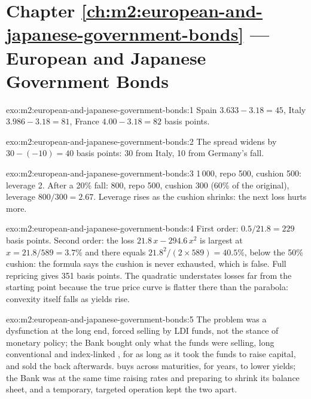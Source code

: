 \section*{Chapter \ref{ch:m2:european-and-japanese-government-bonds} --- European and Japanese Government Bonds}

\begin{solution}{exo:m2:european-and-japanese-government-bonds:1}
Spain $3.633 - 3.18 = 45$, Italy $3.986 - 3.18 = 81$, France $4.00 - 3.18 = 82$
basis points.
\end{solution}

\begin{solution}{exo:m2:european-and-japanese-government-bonds:2}
The spread widens by $30 - (-10) = 40$ basis points: 30 from Italy, 10 from
Germany's fall.
\end{solution}

\begin{solution}{exo:m2:european-and-japanese-government-bonds:3}
 1\,000, repo 500, cushion 500: leverage 2. After a 20\% fall:  800,
repo 500, cushion 300 (60\% of the original), leverage $800/300 = 2.67$. Leverage
rises as the cushion shrinks: the next loss hurts more.
\end{solution}

\begin{solution}{exo:m2:european-and-japanese-government-bonds:4}
First order: $0.5/21.8 = 229$ basis points. Second order: the loss $21.8\,x -
294.6\,x^2$ is largest at $x = 21.8/589 = 3.7\%$ and there equals $21.8^2/(2
\times 589) = 40.5\%$, below the 50\% cushion: the formula says the cushion is
never exhausted, which is false. Full repricing gives 351 basis points. The
quadratic understates losses far from the starting point because the true
price curve is flatter there than the parabola: convexity itself falls as
yields rise.
\end{solution}

\begin{solution}{exo:m2:european-and-japanese-government-bonds:5}
The problem was a dysfunction at the long end, forced selling by LDI funds,
not the stance of monetary policy; the Bank bought only what the funds were
selling, long conventional and index-linked , for as long as it took the
funds to raise capital, and sold the  back afterwards. 
buys across maturities, for years, to lower yields; the Bank was at the same
time raising rates and preparing to shrink its balance sheet, and a
temporary, targeted operation kept the two apart.
\end{solution}

